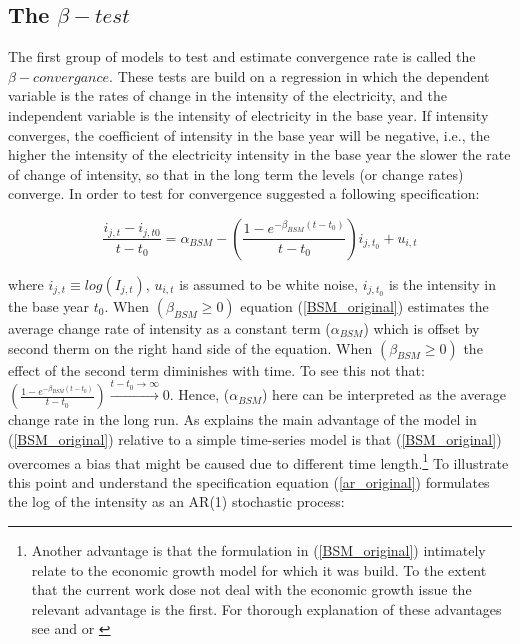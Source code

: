 \documentclass[]{amsart}
\begin{document}
\bigskip

\subsection{The $\beta-test$}

The first group of models to test and estimate convergence rate is called the $\beta-convergance$. These tests are build on a regression in which the dependent variable is the rates of change in the intensity of the electricity, and the independent variable is the intensity of electricity in the base year. If intensity converges, the coefficient of intensity in the base year will be negative, i.e., the higher the intensity of the electricity intensity in the base year the slower the rate of change of intensity, so that in the long term the levels (or change rates) converge. In order to test for convergence \cite{barro1992convergence} suggested a following specification:

\bigskip

\begin{equation}
\frac{i_{j,t}-i_{j,t0}}{t-t_0}  = \alpha_{BSM} - \left( \frac{1- e^{-\beta_{BSM}(t-t_0)}}{t-t_0} \right) i_{j,t_0}+u_{i, t}
\label{BSM_original}
\end{equation}

\bigskip

where $i_{j,t} \equiv log(I_{j,t})$, $u_{i,t}$ is assumed to be white noise, $i_{j,t_0}$ is the intensity in the base year $t_0$. When $(\beta_{BSM} \geq 0)$ equation (\ref{BSM_original}) estimates the average change rate of intensity as a constant term ($\alpha_{BSM}$) which is offset by second therm on the right hand side of the equation. When $(\beta_{BSM} \geq 0)$  the effect of the second term diminishes with time.  To see this not that:
$\left( \frac{1- e^{-\beta_{BSM}(t-t_0)}}{t-t_0} \right) \xrightarrow{t-t_0 \rightarrow \infty} 0$. Hence, ($\alpha_{BSM}$) here can be interpreted as the average change rate in the long run. As \cite{sala1996classical} explains the main advantage of the model in (\ref{BSM_original}) relative to a simple time-series model is that (\ref{BSM_original}) overcomes a bias that might be caused due to different time length.\footnote{Another advantage is that the formulation in (\ref{BSM_original}) intimately relate to the economic growth model for which it was build. To the extent that the current work dose not deal with the economic growth issue the relevant advantage is the first. For thorough explanation of these advantages see \cite{barro1992convergence} and \cite{sala1996classical} or \cite{durlauf2005growth}} To illustrate this point and understand the specification equation (\ref{ar_original}) formulates the log of the intensity as an AR(1) stochastic process:
\end{document}
